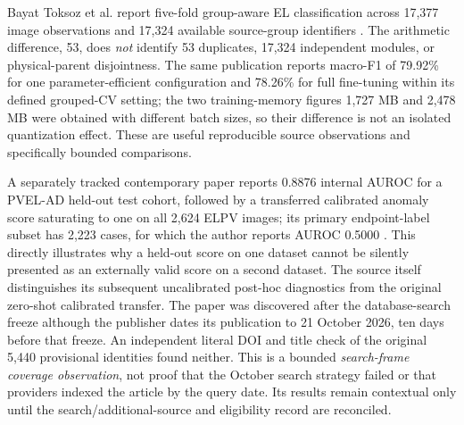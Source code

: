 \documentclass[10pt,a4paper]{article}
\begin{document}
Bayat Toksoz et al. report five-fold group-aware EL classification across 17,377 image observations and 17,324 available source-group identifiers \cite{bayat2026}. The arithmetic difference, 53, does \emph{not} identify 53 duplicates, 17,324 independent modules, or physical-parent disjointness. The same publication reports macro-F1 of 79.92\% for one parameter-efficient configuration and 78.26\% for full fine-tuning within its defined grouped-CV setting; the two training-memory figures 1,727 MB and 2,478 MB were obtained with different batch sizes, so their difference is not an isolated quantization effect. These are useful reproducible source observations and specifically bounded comparisons.

A separately tracked contemporary paper reports 0.8876 internal AUROC for a PVEL-AD held-out test cohort, followed by a transferred calibrated anomaly score saturating to one on all 2,624 ELPV images; its primary endpoint-label subset has 2,223 cases, for which the author reports AUROC 0.5000 \cite{calisan2026}. This directly illustrates why a held-out score on one dataset cannot be silently presented as an externally valid score on a second dataset. The source itself distinguishes its subsequent uncalibrated post-hoc diagnostics from the original zero-shot calibrated transfer. The paper was discovered after the database-search freeze although the publisher dates its publication to 21 October 2026, ten days before that freeze. An independent literal DOI and title check of the original 5,440 provisional identities found neither. This is a bounded \emph{search-frame coverage observation}, not proof that the October search strategy failed or that providers indexed the article by the query date. Its results remain contextual only until the search/additional-source and eligibility record are reconciled.
\end{document}
